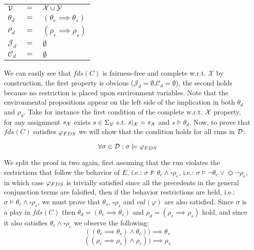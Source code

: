 \begin{tabular}{ l c l }
	${\mathcal{V}}$ & $=$ & ${\mathcal{X}} \cup {\ensuremath{\mathcal{Y}}}$\\	
	$\theta_d$ & $=$ & $(\theta_e \implies \theta_s)$\\
	$\rho_d$ & $=$ & $(\rho_e \implies \rho_s)$\\	
	$\mathcal{J}_d$ & $=$ & $\emptyset$\\
	$\mathcal{C}_d$ & $=$ & $\emptyset$\\
\end{tabular}

We can easily see that $fds(C)$ is fairness-free and complete w.r.t. $\mathcal{X}$ by construction, the first property is obvious ($\mathcal{J}_d=\emptyset$,$\mathcal{C}_d=\emptyset$), the second holds because no restriction is placed upon environment variables. Note that the environmental propositions appear on the left side of the implication in both $\theta_d$ and $\rho_d$. Take for instance the first condition of the complete w.r.t. ${\mathcal{X}}$ property, for any assignment $s_{{\mathcal{X}}}$ exists $s \in \Sigma_{{\mathcal{V}}}$ s.t. $s|_{{\mathcal{X}}}=s_{{\mathcal{X}}}$ and $s \models \theta_d$. Now, to prove that $fds(C)$ satisfies $\varphi_{FDS}$ we will show that the condition holds for all runs in $\mathcal{D}$: 

\[\forall \sigma \in \mathcal{D}: \sigma \models \varphi_{FDS} \]

We split the proof in two again, first assuming that the run violates the restrictions that follow the behavior of $E$, i.e.: $\sigma \not\models \theta_e \wedge \square \rho_e$, i.e.: $\sigma \models \neg\theta_e \vee \Diamond \neg\rho_e$, in which case $\varphi_{FDS}$ is trivially satisfied since all the precedents in the general conjunction terms are falsified, then if the behavior restrictions are held, i.e.: $\sigma \models \theta_e \wedge \square \rho_e$, we must prove that $\theta_s$, $\square\rho_s$ and $val(\varphi)$ are also satisfied. Since $\sigma$ is a play in $fds(C)$ then $\theta_d=(\theta_e \implies \theta_s)$ and $\rho_d=(\rho_e \implies \rho_s)$ hold, and since it also satisfies $\theta_e \wedge \square \rho_e$ we observe the following:
\[((\theta_e \implies \theta_s) \wedge \theta_e))\implies \theta_s\]
\[((\rho_e \implies \rho_s) \wedge \rho_e))\implies \rho_s\]

